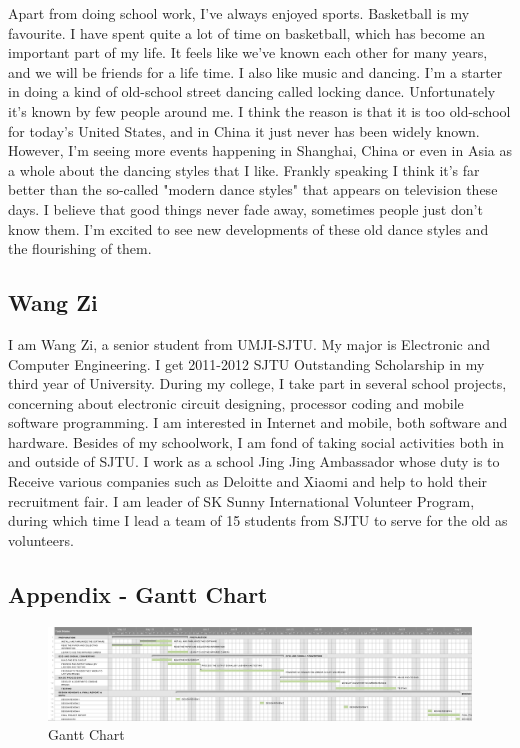 \documentclass[paper=letter, fontsize=11pt]{scrartcl}
\numberwithin{equation}{section}		%
\numberwithin{figure}{section}			%
\numberwithin{table}{section}			%
\begin{document}
Apart from doing school work, I've always enjoyed sports. Basketball is my favourite. I have spent quite a lot of time on basketball, which has become an important part of my life. It feels like we've known each other for many years, and we will be friends for a life time. I also like music and dancing. I'm a starter in doing a kind of old-school street dancing called locking dance. Unfortunately it's known by few people around me. I think the reason is that it is too old-school for today's United States, and in China it just never has been widely known. However, I'm seeing more events happening in Shanghai, China or even in Asia as a whole about the dancing styles that I like. Frankly speaking I think it's far better than the so-called "modern dance styles" that appears on television these days. I believe that good things never fade away, sometimes people just don't know them. I'm excited to see new developments of these old dance styles and the flourishing of them.
\pagebreak
\subsection{Wang Zi}
I am Wang Zi, a senior student from UMJI-SJTU. My major is Electronic and Computer Engineering. I get 2011-2012 SJTU Outstanding Scholarship in my third year of University. During my college, I take part in several school projects, concerning about electronic circuit designing, processor coding and mobile software programming. I am interested in Internet and mobile, both software and hardware. Besides of my schoolwork, I am fond of taking social activities both in and outside of SJTU. I work as a school Jing Jing Ambassador whose duty is to Receive various companies such as Deloitte and Xiaomi and help to hold their recruitment fair. I am leader of SK Sunny International Volunteer Program, during which time I lead a team of 15 students from SJTU to serve for the old as volunteers. 
\pagebreak


\pagebreak
\begin{landscape}
\section{Appendix - Gantt Chart}
\begin{figure}[H]
    	\advance\leftskip-1.5cm
	\includegraphics[scale=0.7]{GANTT}
	\caption{Gantt Chart}
\end{figure}
\end{landscape}
\end{document}
